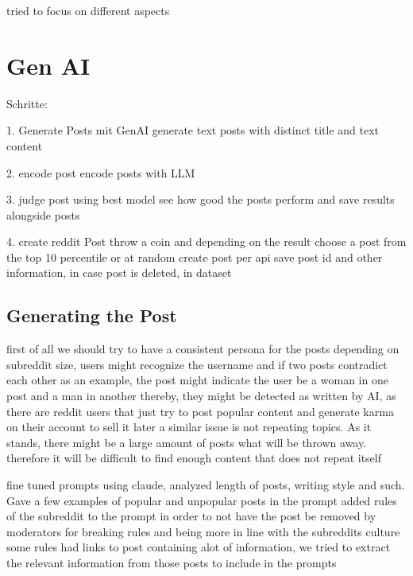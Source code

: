 tried to focus on different aspects




\section{Gen AI}


Schritte:

1. Generate Posts mit GenAI
generate text posts with distinct title and text content

2. encode post
encode posts with LLM

3. judge post using best model
see how good the posts perform and save results alongside posts

4. create reddit Post
throw a coin and depending on the result choose a post from the top 10 percentile or at random
create post per api
save post id and other information, in case post is deleted, in dataset

\subsection{Generating the Post}

first of all we should try to have a consistent persona for the posts
depending on subreddit size, users might recognize the username and if two posts contradict each other
as an example, the post might indicate the user be a woman in one post and a man in another
thereby, they might be detected as written by AI, as there are reddit users that just try to post popular content and generate karma on their account to sell it later
a similar issue is not repeating topics. As it stands, there might be a large amount of posts what will be thrown away. therefore it will be difficult to find enough content that does not repeat itself


fine tuned prompts using claude, analyzed length of posts, writing style and such. Gave a few examples of popular and unpopular posts in the prompt
added rules of the subreddit to the prompt in order to not have the post be removed by moderators for breaking rules and being more in line with the subreddits culture
some rules had links to post containing alot of information, we tried to extract the relevant information from those posts to include in the prompts

